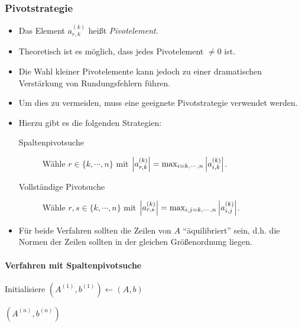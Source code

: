 				\subsubsection{Pivotstrategie}
					\begin{itemize}
						\item Das Element \( a_{r,k}^{(k)} \) heißt \textit{Pivotelement}.
						\item Theoretisch ist es möglich, dass jedes Pivotelement \( \neq 0 \) ist.
						\item Die Wahl kleiner Pivotelemente kann jedoch zu einer dramatischen Verstärkung von Rundungsfehlern führen.
						\item Um dies zu vermeiden, muss eine geeignete Pivotstrategie verwendet werden.
						\item Hierzu gibt es die folgenden Strategien:
							\begin{description}
								\item[Spaltenpivotsuche] Wähle \( r \in \{ k, \cdots, n \} \) mit \( \abs{a_{r,k}^{(k)}} = \max_{i = k, \cdots, n} \abs{a_{i,k}^{(k)}} \).
								\item[Vollständige Pivotsuche] Wähle \( r, s \in \{ k, \cdots, n \} \) mit \( \abs{a_{r,s}^{(k)}} = \max_{i, j = k, \cdots, n} \abs{a_{i,j}^{(k)}} \).
							\end{description}
						\item Für beide Verfahren sollten die Zeilen von \(A\) \enquote{äquilibriert} sein, d.h. die Normen der Zeilen sollten in der gleichen Größenordnung liegen.
					\end{itemize}

					\paragraph{Verfahren mit Spaltenpivotsuche}
						\begin{algorithm}[H]
							Initialisiere \( (A^{(1)}, b^{(1)}) \gets (A, b) \)


							\Return \( (A^{(n)}, b^{(n)}) \)
						\end{algorithm}

